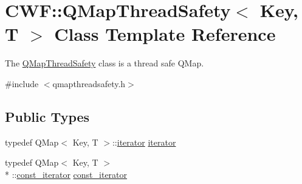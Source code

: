 \hypertarget{class_c_w_f_1_1_q_map_thread_safety}{\section{C\+W\+F\+:\+:Q\+Map\+Thread\+Safety$<$ Key, T $>$ Class Template Reference}
\label{class_c_w_f_1_1_q_map_thread_safety}
}


The \hyperlink{class_c_w_f_1_1_q_map_thread_safety}{Q\+Map\+Thread\+Safety} class is a thread safe Q\+Map.  




{\ttfamily \#include $<$qmapthreadsafety.\+h$>$}

\subsection*{Public Types}
\begin{DoxyCompactItemize}
\item 
typedef Q\+Map$<$ Key, T $>$\+::\hyperlink{class_c_w_f_1_1_q_map_thread_safety_a3c4ab1dfd3da9557e0f2ea9e480466f9}{iterator} \hyperlink{class_c_w_f_1_1_q_map_thread_safety_a3c4ab1dfd3da9557e0f2ea9e480466f9}{iterator}
\item 
typedef Q\+Map$<$ Key, T $>$\\*
\+::\hyperlink{class_c_w_f_1_1_q_map_thread_safety_ae9f60ca27b6f4af8753cf15211fe5c70}{const\+\_\+iterator} \hyperlink{class_c_w_f_1_1_q_map_thread_safety_ae9f60ca27b6f4af8753cf15211fe5c70}{const\+\_\+iterator}
\end{DoxyCompactItemize}
